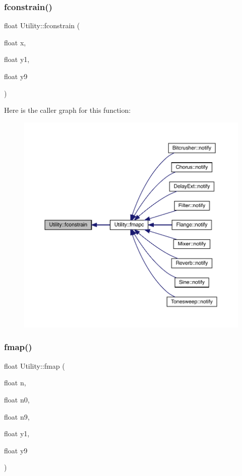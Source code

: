 \subsubsection{\texorpdfstring{fconstrain()}{fconstrain()}}
{\footnotesize\ttfamily float Utility\+::fconstrain (\begin{DoxyParamCaption}\item[{float}]{x,  }\item[{float}]{y1,  }\item[{float}]{y9 }\end{DoxyParamCaption})\hspace{0.3cm}{\ttfamily [static]}}

Here is the caller graph for this function\+:\nopagebreak
\begin{figure}[H]
\begin{center}
\leavevmode
\includegraphics[width=350pt]{class_utility_af50f94cc1c9126f9f2334686158f617f_icgraph}
\end{center}
\end{figure}
\mbox{\label{class_utility_ad35eff6790f16f4afcd546cb5de861c2}} 
\subsubsection{\texorpdfstring{fmap()}{fmap()}}
{\footnotesize\ttfamily float Utility\+::fmap (\begin{DoxyParamCaption}\item[{float}]{n,  }\item[{float}]{n0,  }\item[{float}]{n9,  }\item[{float}]{y1,  }\item[{float}]{y9 }\end{DoxyParamCaption})\hspace{0.3cm}{\ttfamily [static]}}

